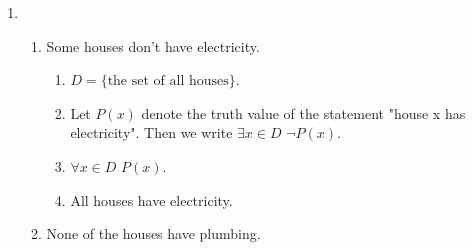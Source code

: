 \documentclass[10pt]{article}
\theoremstyle{plain}
\theoremstyle{definition}
\begin{document}
\begin{enumerate}
\begin{enumerate}
\item $(R$\text{   }\text{ } $S) \Rightarrow P$

\begin{enumerate}
\item $(\neg R \wedge S) \Rightarrow P$

\item If your number is not evenly divisible by any integer other than 1 and itself, and it is odd, then it is prime. 


\item Claim: $(\neg R \wedge S) \Leftrightarrow P$. \begin{proof} By part (a) we know that $\neg R \Leftrightarrow P$. So we must only show that $P \Rightarrow S$. But all the primes other than 2 are odd, and all numbers between 10 and 1,000,000 are greater than 2. \end{proof}\end{enumerate}


\item $S \Rightarrow P$. 
\begin{enumerate}
\item $\neg S \Rightarrow \neg P$. 

\item If your number is not odd, then it is not prime. 

\item The implication cannot be replaced by a biconditional, since $15$ is not prime, but it is odd. 
\end{enumerate}
\end{enumerate}

\item 

\begin{enumerate}
\item Some houses don't have electricity. 

\begin{enumerate}
\item $D = \{\text{the set of all houses}\}$.

\item Let $P(x)$ denote the truth value of the statement "house x has electricity". Then we write $\exists x \in D$ $\neg P(x)$. 

\item $\forall x \in D$ $P(x)$. 
\item All houses have electricity. 
\end{enumerate}

\item None of the houses have plumbing. 


\end{enumerate}
\end{enumerate}
\end{document}
